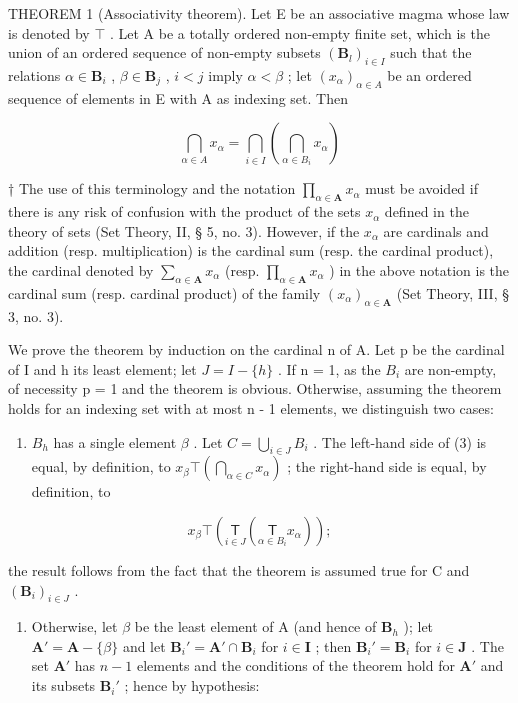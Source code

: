 THEOREM 1 (Associativity theorem). Let E be an associative magma whose law is denoted by \(\top\) . Let A be a totally ordered non-empty finite set, which is the union of an ordered sequence of non-empty subsets \((\mathbf{B}_l)_{i \in I}\) such that the relations \(\alpha \in \mathbf{B}_i\) , \(\beta \in \mathbf{B}_j\) , \(i < j\) imply \(\alpha < \beta\) ; let \((x_\alpha)_{\alpha \in A}\) be an ordered sequence of elements in E with A as indexing set. Then

\[
\bigcap_ {\alpha \in A} x _ {\alpha} = \bigcap_ {i \in I} \left(\bigcap_ {\alpha \in B _ {i}} x _ {\alpha}\right)\tag{3}
\]

† The use of this terminology and the notation \(\prod_{\alpha \in \mathbf{A}} x_{\alpha}\) must be avoided if there is any risk of confusion with the product of the sets \(x_{\alpha}\) defined in the theory of sets (Set Theory, II, § 5, no. 3). However, if the \(x_{\alpha}\) are cardinals and addition (resp. multiplication) is the cardinal sum (resp. the cardinal product), the cardinal denoted by \(\sum_{\alpha \in \mathbf{A}} x_{\alpha}\) (resp. \(\prod_{\alpha \in \mathbf{A}} x_{\alpha}\) ) in the above notation is the cardinal sum (resp. cardinal product) of the family \((x_{\alpha})_{\alpha \in \mathbf{A}}\) (Set Theory, III, § 3, no. 3).

We prove the theorem by induction on the cardinal n of A. Let p be the cardinal of I and h its least element; let \(J = I - \{h\}\) . If n = 1, as the \(B_{i}\) are non-empty, of necessity p = 1 and the theorem is obvious. Otherwise, assuming the theorem holds for an indexing set with at most n - 1 elements, we distinguish two cases:

\begin{enumerate}
\def\labelenumi{(\alph{enumi})}
\tightlist
\item
  \(B_{h}\) has a single element \(\beta\) . Let \(C = \bigcup_{i \in J} B_{i}\) . The left-hand side of (3) is equal, by definition, to \(x_{\beta} \top \left( \bigcap_{\alpha \in C} x_{\alpha} \right)\) ; the right-hand side is equal, by definition, to
\end{enumerate}

\[
x _ {\beta} \top \left(\underset {i \in J} {\mathsf {T}} \left(\underset {\alpha \in B _ {i}} {\mathsf {T}} x _ {\alpha}\right)\right);
\]

the result follows from the fact that the theorem is assumed true for C and \((\mathbf{B}_{i})_{i\in J}\) .

\begin{enumerate}
\def\labelenumi{(\alph{enumi})}
\setcounter{enumi}{1}
\tightlist
\item
  Otherwise, let \(\beta\) be the least element of A (and hence of \(\mathbf{B}_h\) ); let \(\mathbf{A}' = \mathbf{A} - \{\beta\}\) and let \(\mathbf{B}_i' = \mathbf{A}' \cap \mathbf{B}_i\) for \(i \in \mathbf{I}\) ; then \(\mathbf{B}_i' = \mathbf{B}_i\) for \(i \in \mathbf{J}\) . The set \(\mathbf{A}'\) has \(n - 1\) elements and the conditions of the theorem hold for \(\mathbf{A}'\) and its subsets \(\mathbf{B}_i'\) ; hence by hypothesis:
\end{enumerate}

